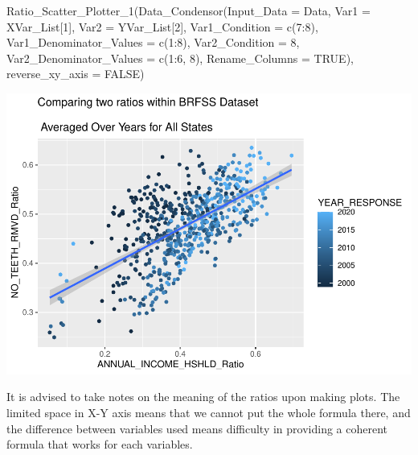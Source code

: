 \documentclass[
]{article}
\newenvironment{Shaded}{\begin{snugshade}}{\end{snugshade}}
\newcommand{\AttributeTok}[1]{\textcolor[rgb]{0.77,0.63,0.00}{#1}}
\newcommand{\ConstantTok}[1]{\textcolor[rgb]{0.00,0.00,0.00}{#1}}
\newcommand{\DecValTok}[1]{\textcolor[rgb]{0.00,0.00,0.81}{#1}}
\newcommand{\FunctionTok}[1]{\textcolor[rgb]{0.00,0.00,0.00}{#1}}
\newcommand{\NormalTok}[1]{#1}
\newcommand{\SpecialCharTok}[1]{\textcolor[rgb]{0.00,0.00,0.00}{#1}}
\begin{document}
\begin{Shaded}
\begin{Highlighting}[]
\FunctionTok{Ratio\_Scatter\_Plotter\_1}\NormalTok{(}\FunctionTok{Data\_Condensor}\NormalTok{(}\AttributeTok{Input\_Data =}\NormalTok{ Data,}
                                        \AttributeTok{Var1 =}\NormalTok{ XVar\_List[}\DecValTok{1}\NormalTok{],}
                                        \AttributeTok{Var2 =}\NormalTok{ YVar\_List[}\DecValTok{2}\NormalTok{],}
                                        \AttributeTok{Var1\_Condition =} \FunctionTok{c}\NormalTok{(}\DecValTok{7}\SpecialCharTok{:}\DecValTok{8}\NormalTok{),}
                                        \AttributeTok{Var1\_Denominator\_Values =} \FunctionTok{c}\NormalTok{(}\DecValTok{1}\SpecialCharTok{:}\DecValTok{8}\NormalTok{),}
                                        \AttributeTok{Var2\_Condition =} \DecValTok{8}\NormalTok{, }
                                        \AttributeTok{Var2\_Denominator\_Values =} \FunctionTok{c}\NormalTok{(}\DecValTok{1}\SpecialCharTok{:}\DecValTok{6}\NormalTok{, }\DecValTok{8}\NormalTok{),}
                                        \AttributeTok{Rename\_Columns =} \ConstantTok{TRUE}\NormalTok{),}
                        \AttributeTok{reverse\_xy\_axis =} \ConstantTok{FALSE}\NormalTok{)}
\end{Highlighting}
\end{Shaded}

\includegraphics{BRFSS_Graphic_Reproduction_files/figure-latex/unnamed-chunk-8-1.pdf}

It is advised to take notes on the meaning of the ratios upon making
plots. The limited space in X-Y axis means that we cannot put the whole
formula there, and the difference between variables used means
difficulty in providing a coherent formula that works for each
variables.
\end{document}
